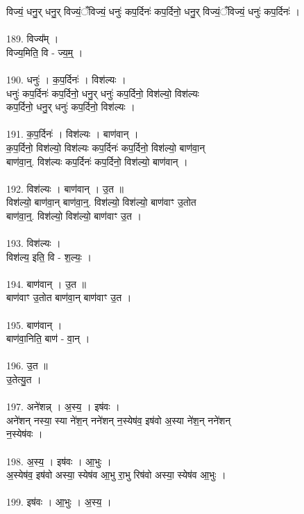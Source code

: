 विज्यं॒ धनु॒र् धनु॒र् विज्यं॒ँविज्यं॒ धनुः॑ कप॒र्दिनः॑ कप॒र्दिनो॒ धनु॒र् विज्यं॒ँविज्यं॒ धनुः॑ कप॒र्दिनः॑ ।\\
\\
189. विज्य᳚म् ।\\
विज्य॒मिति॒ वि - ज्य॒म्॒ ।\\
\\
190. धनुः॑ । क॒प॒र्दिनः॑ । विश॑ल्यः ।\\
धनुः॑ कप॒र्दिनः॑ कप॒र्दिनो॒ धनु॒र् धनुः॑ कप॒र्दिनो॒ विश॑ल्यो॒ विश॑ल्यः\\
कप॒र्दिनो॒ धनु॒र् धनुः॑ कप॒र्दिनो॒ विश॑ल्यः ।\\
\\
191. क॒प॒र्दिनः॑ । विश॑ल्यः । बाण॑वान् ।\\
क॒प॒र्दिनो॒ विश॑ल्यो॒ विश॑ल्यः कप॒र्दिनः॑ कप॒र्दिनो॒ विश॑ल्यो॒ बाण॑वा॒न्\\
बाण॑वा॒न्॒. विश॑ल्यः कप॒र्दिनः॑ कप॒र्दिनो॒ विश॑ल्यो॒ बाण॑वान् ।\\
\\
192. विश॑ल्यः । बाण॑वान् । उ॒त ॥\\
विश॑ल्यो॒ बाण॑वा॒न् बाण॑वा॒न्॒. विश॑ल्यो॒ विश॑ल्यो॒ बाण॑वाꣳ उ॒तोत\\
बाण॑वा॒न्॒. विश॑ल्यो॒ विश॑ल्यो॒ बाण॑वाꣳ उ॒त ।\\
\\
193. विश॑ल्यः ।\\
विश॑ल्य॒ इति॒ वि - श॒ल्यः॒ ।\\
\\
194. बाण॑वान् । उ॒त ॥\\
बाण॑वाꣳ उ॒तोत बाण॑वा॒न् बाण॑वाꣳ उ॒त ।\\
\\
195. बाण॑वान् ।\\
बाण॑वा॒निति॒ बाण॑ - वा॒न् ।\\
\\
196. उ॒त ॥\\
उ॒तेत्यु॒त ।\\
\\
197. अने॑शन्न् । अ॒स्य॒ । इष॑वः ।\\
अने॑शन् नस्या॒ स्या ने॑श॒न् नने॑शन् न॒स्येष॑व॒ इष॑वो अ॒स्या ने॑श॒न् नने॑शन्\\
न॒स्येष॑वः ।\\
\\
198. अ॒स्य॒ । इष॑वः । आ॒भुः ।\\
अ॒स्येष॑व॒ इष॑वो अस्या॒ स्येष॑व आ॒भु रा॒भु रिष॑वो अस्या॒ स्येष॑व आ॒भुः ।\\
\\
199. इष॑वः । आ॒भुः । अ॒स्य॒ ।\\

